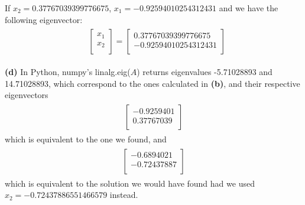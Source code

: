 \documentclass[leqno]{article}
\begin{document}
If $x_2 = 0.37767039399776675$, $x_1 = -0.92594010254312431$ and we have the following eigenvector:
\begin{gather*}
\begin{split}
&\begin{bmatrix}
    x_1 \\
    x_2  \\
\end{bmatrix} =
\begin{bmatrix} 
   0.37767039399776675\\
   -0.92594010254312431\\
\end{bmatrix}
\end{split}
\end{gather*}

\noindent \textbf{(d)} In Python, numpy's linalg.eig($A$) returns eigenvalues -5.71028893 and  14.71028893,
which correspond to the ones calculated in \textbf{(b)}, and their respective eigenvectors
\begin{gather*}
\begin{split}
\begin{bmatrix} 
   -0.9259401\\
   0.37767039\\
\end{bmatrix}
\end{split}
\end{gather*}
which is equivalent to the one we found, and
\begin{gather*}
\begin{split}
\begin{bmatrix} 
   -0.6894021\\
   -0.72437887\\
\end{bmatrix}
\end{split}
\end{gather*}
which is equivalent to the solution we would have found had we used $x_2 = -0.72437886551466579$ instead.


\hfill
\end{document}
